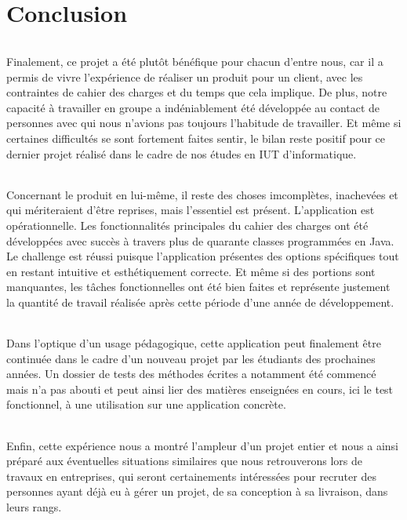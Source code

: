 \documentclass[a4paper,10pt]{report}
\begin{document}
    

\part{Conclusion}
  \paragraph{}
    Finalement, ce projet a été plutôt bénéfique pour chacun d'entre nous, car il a permis de vivre l'expérience de réaliser un produit pour un client, avec les contraintes de cahier des charges et du temps que cela implique.
    De plus, notre capacité à travailler en groupe a indéniablement été développée au contact de personnes avec qui nous n'avions pas toujours l'habitude de travailler.
    Et même si certaines difficultés se sont fortement faites sentir, le bilan reste positif pour ce dernier projet réalisé dans le cadre de nos études en IUT d'informatique.
    
    \paragraph{}
      Concernant le produit en lui-même, il reste des choses imcomplètes, inachevées et qui mériteraient d'être reprises, mais l'essentiel est présent.
      L'application est opérationnelle. Les fonctionnalités principales du cahier des charges ont été développées avec succès à travers plus de quarante classes programmées en Java.
      Le challenge est réussi puisque l'application présentes des options spécifiques tout en restant intuitive et esthétiquement correcte.
      Et même si des portions sont manquantes, les tâches fonctionnelles ont été bien faites et représente justement la quantité de travail réalisée après cette période d'une année de développement.
      
    \paragraph{}
      Dans l'optique d'un usage pédagogique, cette application peut finalement être continuée dans le cadre d'un nouveau projet par les étudiants des prochaines années.
      Un dossier de tests des méthodes écrites a notamment été commencé mais n'a pas abouti et peut ainsi lier des matières enseignées en cours, ici le test fonctionnel, à une utilisation sur une application concrète.
      
      
    \paragraph{}
      Enfin, cette expérience nous a montré l'ampleur d'un projet entier et nous a ainsi préparé aux éventuelles situations similaires que nous retrouverons lors de travaux en entreprises, qui seront certainements intéressées pour recruter des personnes ayant déjà eu à gérer un projet, de sa conception à sa livraison, dans leurs rangs.
    
\end{document}
